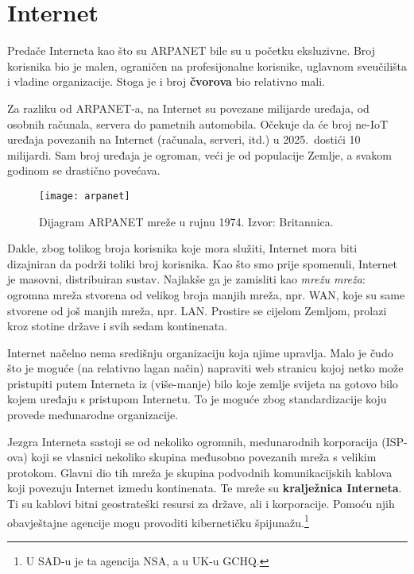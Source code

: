 
\section[Internet]{Internet}

Predače Interneta kao što su ARPANET bile su u početku eksluzivne.
Broj korisnika bio je malen, ograničen na profesijonalne korisnike, uglavnom sveučilišta i vladine organizacije.
Stoga je i broj \textbf{čvorova} bio relativno mali.

Za razliku od ARPANET-a, na Internet su povezane milijarde uređaja, od osobnih računala, servera do pametnih automobila.
Očekuje da će broj ne-IoT uređaja povezanih na Internet (računala, serveri, itd.) u 2025.\ dostići 10 milijardi.
Sam broj uređaja je ogroman, veći je od populacije Zemlje, a svakom godinom se drastično povećava.


\begin{figure}[h]\label{fig:arpanet}
\texttt{[image: arpanet]}
\raggedleft
\caption{Dijagram ARPANET mreže u rujnu 1974. Izvor: Britannica.}
\end{figure}

Dakle, zbog tolikog broja korisnika koje mora služiti, Internet mora biti dizajniran da podrži toliki broj korisnika.
Kao što smo prije spomenuli, Internet je masovni, distribuiran sustav.
Najlakše ga je zamisliti kao \textit{mrežu mreža}: ogromna mreža stvorena od velikog broja manjih mreža, npr. WAN, koje su same stvorene od još manjih mreža, npr. LAN.
Prostire se cijelom Zemljom, prolazi kroz stotine države i svih sedam kontinenata.

Internet načelno nema središnju organizaciju koja njime upravlja.
Malo je čudo što je moguće (na relativno lagan način) napraviti web stranicu kojoj netko može pristupiti putem Interneta iz (više-manje) bilo koje zemlje svijeta na gotovo bilo kojem uređaju s pristupom Internetu.
To je moguće zbog standardizacije koju provede međunarodne organizacije.

Jezgra Interneta sastoji se od nekoliko ogromnih, medunarodnih korporacija (ISP-ova) koji se vlasnici nekoliko skupina međusobno povezanih  mreža s velikim protokom.
Glavni dio tih mreža je skupina podvodnih komunikacijskih kablova koji povezuju Internet izmedu kontinenata.
Te mreže su \textbf{kralježnica Interneta}.
Ti su kablovi bitni geostrateški resursi za države, ali i korporacije.
Pomoću njih obavještajne agencije mogu provoditi kibernetičku špijunažu.\footnote{U SAD-u je ta agencija NSA, a u UK-u GCHQ.}

